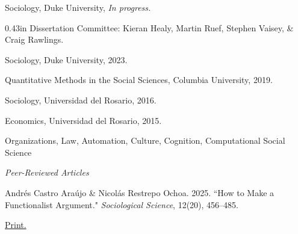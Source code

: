 \documentclass[11pt,article,oneside]{memoir}
\begin{document}
\bigskip


\reversemarginpar

\bigskip



\ind {} Sociology, Duke University, \emph{In progress.} \par

\ind
{%
   0.43in \dimexpr\linewidth-0.43in\relax
  \footnotesize
  Dissertation Committee: Kieran Healy, Martin Ruef, Stephen Vaisey,
  \& Craig Rawlings.
  \normalsize\par
}

\ind {} Sociology, Duke University, 2023. \par

\ind {} Quantitative Methods in the Social Sciences, Columbia University, 2019. \par

\ind {} Sociology, Universidad del Rosario, 2016. \par

\ind {} Economics, Universidad del Rosario, 2015. \par

\bigskip

\medskip

\noindent Organizations, Law, Automation, Culture, Cognition, Computational Social Science

\bigskip

 
\medskip

\ind \emph{Peer-Reviewed Articles}\par \vspace{0.075in}


\ind \normalsize \colorbox{Gray!15}{Andrés Castro Araújo} \& Nicolás Restrepo Ochoa. 2025. ``How to Make a Functionalist Argument." \emph{Sociological Science}, 12(20), 456–485. \par
\ind \hspace{0.35in} \footnotesize \href{http://dx.doi.org/10.15195/v12.a20}{Print.} \vspace{0.05in}
\end{document}
